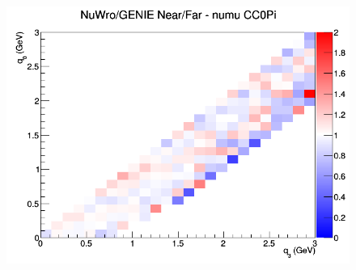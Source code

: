 \begin{figure}[h]
\endminipage
{}
\includegraphics[width=\linewidth]{q0_q3/nominal/ratios/CC0Pi_NuWro_GENIE_numu_NF_q3_q0.png}
\endminipage
\newline
\end{figure}
\clearpage
